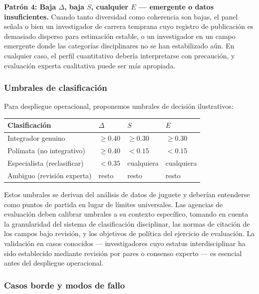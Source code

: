 \documentclass[
]{article}
\begin{document}
\textbf{Patrón 4: Baja \(\Delta\), baja \(S\), cualquier \(E\) ---
emergente o datos insuficientes.} Cuando tanto diversidad como
coherencia son bajas, el panel señala o bien un investigador de carrera
temprana cuyo registro de publicación es demasiado disperso para
estimación estable, o un investigador en un campo emergente donde las
categorías disciplinares no se han estabilizado aún. En cualquier caso,
el perfil cuantitativo debería interpretarse con precaución, y
evaluación experta cualitativa puede ser más apropiada.

\hypertarget{umbrales-de-clasificaciuxf3n}{%
\subsubsection{Umbrales de
clasificación}\label{umbrales-de-clasificaciuxf3n}}

Para despliegue operacional, proponemos umbrales de decisión
ilustrativos:

\begin{longtable}[]{@{}llll@{}}
\toprule
Clasificación & \(\Delta\) & \(S\) & \(E\) \\
\midrule
\endhead
Integrador genuino & \(\ge 0.40\) & \(\ge 0.30\) & \(\ge 0.30\) \\
Polímata (no integrativo) & \(\ge 0.40\) & \(< 0.15\) & \(< 0.15\) \\
Especialista (reclasificar) & \(< 0.35\) & cualquiera & cualquiera \\
Ambiguo (revisión experta) & resto & resto & resto \\
\bottomrule
\end{longtable}

Estos umbrales se derivan del análisis de datos de juguete y deberían
entenderse como puntos de partida en lugar de límites universales. Las
agencias de evaluación deben calibrar umbrales a su contexto específico,
tomando en cuenta la granularidad del sistema de clasificación
disciplinar, las normas de citación de los campos bajo revisión, y los
objetivos de política del ejercicio de evaluación. La validación en
casos conocidos --- investigadores cuyo estatus interdisciplinar ha sido
establecido mediante revisión por pares o consenso experto --- es
esencial antes del despliegue operacional.

\hypertarget{casos-borde-y-modos-de-fallo}{%
\subsubsection{Casos borde y modos de
fallo}\label{casos-borde-y-modos-de-fallo}}
\end{document}
